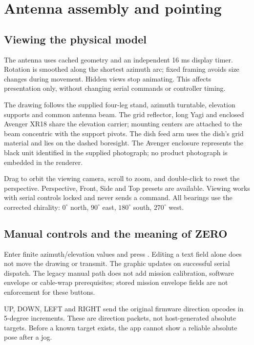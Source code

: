 \section{Antenna assembly and pointing}\label{sec:antenna}
\subsection{Viewing the physical model}
The antenna uses cached geometry and an independent 16 ms display timer. Rotation
is smoothed along the shortest azimuth arc; fixed framing avoids size changes
during movement. Hidden views stop animating. This affects presentation only,
without changing serial commands or controller timing.

The drawing follows the supplied four-leg stand, azimuth turntable, elevation
supports and common antenna beam. The grid reflector, long Yagi and enclosed
Avenger XR18 share the elevation carrier; mounting centers are attached to the
beam concentric with the support pivots. The dish feed arm uses the dish's grid
material and lies on the dashed boresight. The Avenger enclosure represents the
black unit identified in the supplied photograph; no product photograph is
embedded in the renderer.

Drag to orbit the viewing camera, scroll to zoom, and double-click to reset the
perspective. Perspective, Front, Side and Top presets are available. Viewing
works with serial controls locked and never sends a command. All bearings use
the corrected chirality: \(0^\circ\) north, \(90^\circ\) east, \(180^\circ\) south,
\(270^\circ\) west.



\subsection{Manual controls and the meaning of ZERO}
Enter finite azimuth/elevation values and press . Editing a text field
alone does not move the drawing or transmit. The graphic updates on successful
serial dispatch. The legacy manual path does not add mission calibration,
software envelope or cable-wrap prerequisites; stored mission envelope fields
are not enforcement for these buttons.

UP, DOWN, LEFT and RIGHT send the original firmware direction opcodes in
5-degree increments. These are direction packets, not host-generated absolute
targets. Before a known target exists, the app cannot show a reliable absolute
pose after a jog.

